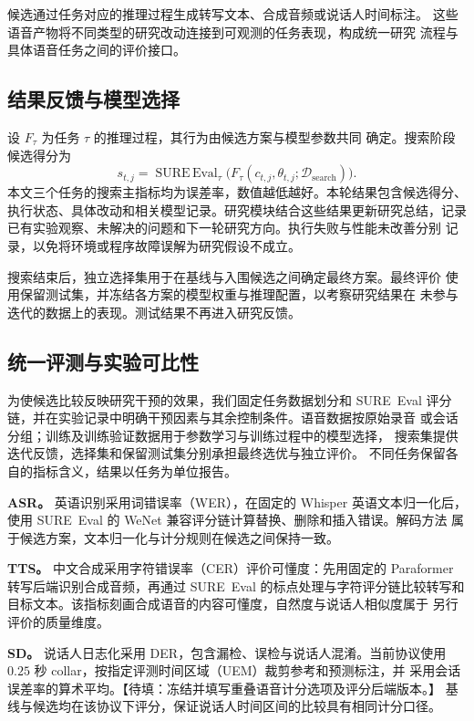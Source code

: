 \documentclass{article}
\newcommand{\pending}[1]{\textcolor{blue!65!black}{【待填：#1】}}
\begin{document}
候选通过任务对应的推理过程生成转写文本、合成音频或说话人时间标注。
这些语音产物将不同类型的研究改动连接到可观测的任务表现，构成统一研究
流程与具体语音任务之间的评价接口。

\subsection{结果反馈与模型选择}

设 $F_{\tau}$ 为任务 $\tau$ 的推理过程，其行为由候选方案与模型参数共同
确定。搜索阶段候选得分为
\begin{equation}
s_{t,j}=\operatorname{SURE\,Eval}_{\tau}
 \bigl(F_{\tau}(c_{t,j},\theta_{t,j};\mathcal{D}_{\mathrm{search}})\bigr).
\end{equation}
本文三个任务的搜索主指标均为误差率，数值越低越好。本轮结果包含候选得分、
执行状态、具体改动和相关模型记录。研究模块结合这些结果更新研究总结，记录
已有实验观察、未解决的问题和下一轮研究方向。执行失败与性能未改善分别
记录，以免将环境或程序故障误解为研究假设不成立。

搜索结束后，独立选择集用于在基线与入围候选之间确定最终方案。最终评价
使用保留测试集，并冻结各方案的模型权重与推理配置，以考察研究结果在
未参与迭代的数据上的表现。测试结果不再进入研究反馈。

\subsection{统一评测与实验可比性}
\label{sec:evaluation}

为使候选比较反映研究干预的效果，我们固定任务数据划分和 SURE~Eval
评分链，并在实验记录中明确干预因素与其余控制条件。语音数据按原始录音
或会话分组；训练及训练验证数据用于参数学习与训练过程中的模型选择，
搜索集提供迭代反馈，选择集和保留测试集分别承担最终选优与独立评价。
不同任务保留各自的指标含义，结果以任务为单位报告。

\textbf{ASR。}
英语识别采用词错误率（WER），在固定的 Whisper 英语文本归一化后，
使用 SURE~Eval 的 WeNet 兼容评分链计算替换、删除和插入错误。解码方法
属于候选方案，文本归一化与计分规则在候选之间保持一致。

\textbf{TTS。}
中文合成采用字符错误率（CER）评价可懂度：先用固定的 Paraformer
转写后端识别合成音频，再通过 SURE~Eval 的标点处理与字符评分链比较转写和
目标文本。该指标刻画合成语音的内容可懂度，自然度与说话人相似度属于
另行评价的质量维度。

\textbf{SD。}
说话人日志化采用 DER，包含漏检、误检与说话人混淆。当前协议使用
$0.25$ 秒 collar，按指定评测时间区域（UEM）裁剪参考和预测标注，并
采用会话误差率的算术平均。\pending{冻结并填写重叠语音计分选项及评分后端版本。}
基线与候选均在该协议下评分，保证说话人时间区间的比较具有相同计分口径。
\end{document}
